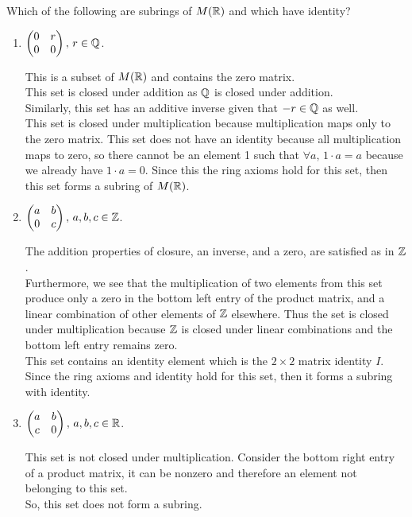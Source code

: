 \documentclass[../hw3]{subfiles}
\begin{document}
\begin{problem}
Which of the following are subrings of $M(\mathbb{R})$ and which have identity?
\end{problem}
\begin{enumerate}[label=\alph*)]
	\item $\begin{pmatrix} 0 & r \\ 0 & 0 \end{pmatrix} ,\, r\in \mathbb{Q}$.

	      This is a subset of $M(\mathbb{R})$ and contains the zero matrix. \\
	      This set is closed under addition as $\mathbb{Q}$ is closed under addition. \\
	      Similarly, this set has an additive inverse given that $-r\in \mathbb{Q}$ as well. \\
	      This set is closed under multiplication because multiplication maps only to the zero matrix.
	      This set does not have an identity because all multiplication maps to zero, so there cannot be an element 1 such that $\forall a,\, 1\cdot a = a$ because we already have $1\cdot a=0$.
	      Since this the ring axioms hold for this set, then this set forms a subring of $M(\mathbb{R})$.

	\item $\begin{pmatrix} a & b \\ 0 & c \end{pmatrix},\, a,b,c\in \mathbb{Z}$.

	      The addition properties of closure, an inverse, and a zero, are satisfied as in $\mathbb{Z}$. \\
	      Furthermore, we see that the multiplication of two elements from this set produce only a zero in the bottom left entry of the product matrix, and a linear combination of other elements of $\mathbb{Z}$ elsewhere. Thus the set is closed under multiplication because $\mathbb{Z}$ is closed under linear combinations and the bottom left entry remains zero. \\
	      This set contains an identity element which is the $2\times 2$ matrix identity $I$.
	      Since the ring axioms and identity hold for this set, then it forms a subring with identity.

	\item $\begin{pmatrix} a & b \\ c & 0 \end{pmatrix},\, a,b,c\in \mathbb{R}$.

	      This set is not closed under multiplication. Consider the bottom right entry of a product matrix, it can be nonzero and therefore an element not belonging to this set. \\
	      So, this set does not form a subring.


\end{enumerate}
\end{document}
